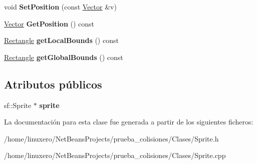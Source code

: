 \begin{DoxyCompactItemize}
\item 
\hypertarget{classSprite_ae010503cdb7aaf3d9cbe88dfbca1751a}{void {\bfseries Set\-Position} (const \hyperlink{classVector}{Vector} \&v)}\label{classSprite_ae010503cdb7aaf3d9cbe88dfbca1751a}

\item 
\hypertarget{classSprite_ae94877d7364caa68b2c59f07dfaf14b7}{\hyperlink{classVector}{Vector} {\bfseries Get\-Position} () const }\label{classSprite_ae94877d7364caa68b2c59f07dfaf14b7}

\item 
\hypertarget{classSprite_a5a6ed9cc8ffa5da96f938801959feedc}{\hyperlink{classRectangle}{Rectangle} {\bfseries get\-Local\-Bounds} () const }\label{classSprite_a5a6ed9cc8ffa5da96f938801959feedc}

\item 
\hypertarget{classSprite_a62c65aecd9dee6df6cdcd0c27e3f73d4}{\hyperlink{classRectangle}{Rectangle} {\bfseries get\-Global\-Bounds} () const }\label{classSprite_a62c65aecd9dee6df6cdcd0c27e3f73d4}

\end{DoxyCompactItemize}
\subsection*{Atributos públicos}
\begin{DoxyCompactItemize}
\item 
\hypertarget{classSprite_a77eaa813c82468ee00795259391e2c4b}{sf\-::\-Sprite $\ast$ {\bfseries sprite}}\label{classSprite_a77eaa813c82468ee00795259391e2c4b}

\end{DoxyCompactItemize}


La documentación para esta clase fue generada a partir de los siguientes ficheros\-:\begin{DoxyCompactItemize}
\item 
/home/linuxero/\-Net\-Beans\-Projects/prueba\-\_\-colisiones/\-Clases/Sprite.\-h\item 
/home/linuxero/\-Net\-Beans\-Projects/prueba\-\_\-colisiones/\-Clases/Sprite.\-cpp\end{DoxyCompactItemize}

